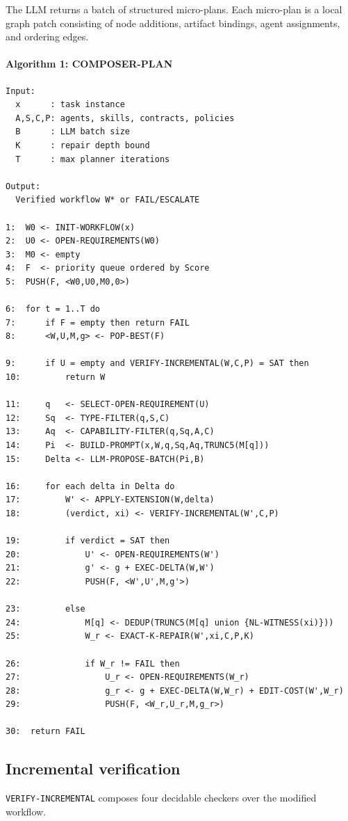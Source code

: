 \documentclass[11pt]{article}
\begin{document}
The LLM returns a batch of structured micro-plans. Each micro-plan is a local graph patch consisting of node additions, artifact bindings, agent assignments, and ordering edges.

\paragraph{Algorithm 1: COMPOSER-PLAN}
\begin{verbatim}
Input:
  x      : task instance
  A,S,C,P: agents, skills, contracts, policies
  B      : LLM batch size
  K      : repair depth bound
  T      : max planner iterations

Output:
  Verified workflow W* or FAIL/ESCALATE

1:  W0 <- INIT-WORKFLOW(x)
2:  U0 <- OPEN-REQUIREMENTS(W0)
3:  M0 <- empty
4:  F  <- priority queue ordered by Score
5:  PUSH(F, <W0,U0,M0,0>)

6:  for t = 1..T do
7:      if F = empty then return FAIL
8:      <W,U,M,g> <- POP-BEST(F)

9:      if U = empty and VERIFY-INCREMENTAL(W,C,P) = SAT then
10:         return W

11:     q   <- SELECT-OPEN-REQUIREMENT(U)
12:     Sq  <- TYPE-FILTER(q,S,C)
13:     Aq  <- CAPABILITY-FILTER(q,Sq,A,C)
14:     Pi  <- BUILD-PROMPT(x,W,q,Sq,Aq,TRUNC5(M[q]))
15:     Delta <- LLM-PROPOSE-BATCH(Pi,B)

16:     for each delta in Delta do
17:         W' <- APPLY-EXTENSION(W,delta)
18:         (verdict, xi) <- VERIFY-INCREMENTAL(W',C,P)

19:         if verdict = SAT then
20:             U' <- OPEN-REQUIREMENTS(W')
21:             g' <- g + EXEC-DELTA(W,W')
22:             PUSH(F, <W',U',M,g'>)

23:         else
24:             M[q] <- DEDUP(TRUNC5(M[q] union {NL-WITNESS(xi)}))
25:             W_r <- EXACT-K-REPAIR(W',xi,C,P,K)

26:             if W_r != FAIL then
27:                 U_r <- OPEN-REQUIREMENTS(W_r)
28:                 g_r <- g + EXEC-DELTA(W,W_r) + EDIT-COST(W',W_r)
29:                 PUSH(F, <W_r,U_r,M,g_r>)

30:  return FAIL
\end{verbatim}

\subsection{Incremental verification}
\texttt{VERIFY-INCREMENTAL} composes four decidable checkers over the modified workflow.
\end{document}
